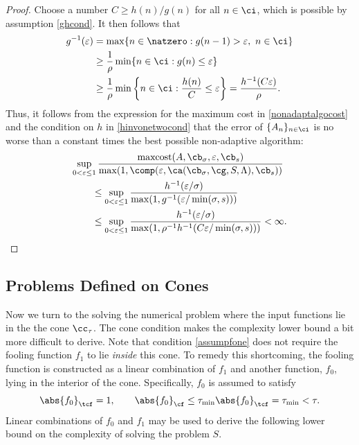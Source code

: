 \documentclass[]{elsarticle}
\DeclareMathOperator{\maxcost}{maxcost}
\theoremstyle{definition}
\theoremstyle{remark}
\newcommand{\Fnorm}[1]{\abs{#1}_{\cf}}
\newcommand{\Ftnorm}[1]{\abs{#1}_{\tcf}}
\begin{document}
\begin{proof}  Choose a number $C \ge h(n)/g(n)$ for all $n \in \ci$, which is possible by assumption \eqref{ghcond}.  It then follows that
\begin{align*}
g^{-1}(\varepsilon) &= \max \{ n \in \natzero : g(n-1) > \varepsilon, \ n \in \ci \} \\ 
& \ge \frac{1}{\rho}\min\{ n \in \ci : g(n) \le \varepsilon\}  \\
& \ge \frac{1}{\rho} \min \left \{ n \in \ci : \frac{h(n)}{C} \le \varepsilon \right\} = \frac{h^{-1}(C \varepsilon)}{\rho}.
\end{align*}
Thus, it follows from the expression for the maximum cost in \eqref{nonadaptalgocost} and the condition on $h$ in \eqref{hinvonetwocond} that the error of $\{A_n\}_{n \in \ci}$ is no worse than a constant times the best possible non-adaptive algorithm:
\begin{align*}
\MoveEqLeft{\sup_{0 < \varepsilon \le 1} \frac{\maxcost(A,\cb_{\sigma},\varepsilon,\cb_{s})}
{\max(1,\comp(\varepsilon,\ca(\cb_{\sigma},\cg,S,\Lambda),\cb_s))}} \\
& \le \sup_{0 < \varepsilon \le 1} \frac{h^{-1}(\varepsilon/\sigma)} {\max(1,g^{-1}(\varepsilon/\min(\sigma,s)))} \\
& \le \sup_{0 < \varepsilon \le 1} \frac{h^{-1}(\varepsilon/\sigma)} {\max(1,\rho^{-1} h^{-1}(C\varepsilon/\min(\sigma,s)))} <\infty.
\end{align*}
\end{proof}

\subsection{Problems Defined on Cones} 

Now we turn to the solving the numerical problem where the input functions lie in the the cone $\cc_{\tau}$.  The cone condition makes the complexity lower bound a bit more difficult to derive.  Note that condition \eqref{assumpfone} does not require the fooling function $f_1$ to lie \emph{inside} this cone.  To remedy this shortcoming, the fooling function is constructed as a linear combination of $f_1$ and another function, $f_0$, lying in the interior of the cone.
Specifically, $f_0$ is assumed to satisfy
\begin{equation}
\label{assumpfzero}
\Ftnorm{f_{0}} = 1, \qquad \Fnorm{f_{0}} \le \tau_{\min} \Ftnorm{f_{0}} = \tau_{\min} < \tau.
\end{equation}
Linear combinations of $f_0$ and $f_1$ may be used to derive the following lower bound on the complexity of solving the problem $S$.
\end{document}
